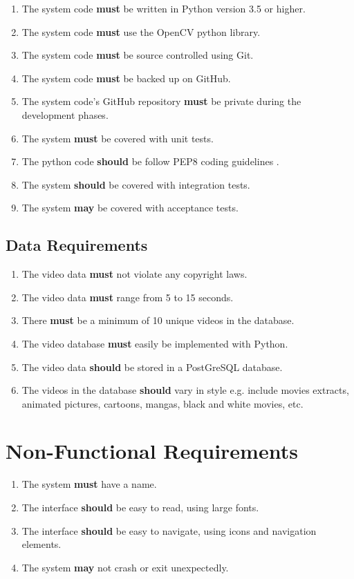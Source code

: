 \begin{enumerate}
    \item The system code \textbf{must} be written in Python version 3.5 or higher.
    \item The system code \textbf{must} use the OpenCV python library.
    \item The system code \textbf{must} be source controlled using Git.
    \item The system code \textbf{must} be backed up on GitHub.
    \item The system code's GitHub repository \textbf{must} be private during the development phases.
    \item The system \textbf{must} be covered with unit tests.
    \item The python code \textbf{should} be follow PEP8 coding guidelines \cite{pep8}.
    \item The system \textbf{should} be covered with integration tests.
    \item The system \textbf{may} be covered with acceptance tests.
\end{enumerate}

\subsection{Data Requirements}

\begin{enumerate}
    \item The video data \textbf{must} not violate any copyright laws.
    \item The video data \textbf{must} range from 5 to 15 seconds.
    \item There \textbf{must} be a minimum of 10 unique videos in the database.
    \item The video database \textbf{must} easily be implemented with Python.
    \item The video data \textbf{should} be stored in a PostGreSQL database.
    \item The videos in the database \textbf{should} vary in style e.g. include movies extracts, animated pictures, cartoons, mangas, black and white movies, etc.
    
\end{enumerate}

\section{Non-Functional Requirements}

\begin{enumerate}
    \item The system \textbf{must} have a name.
    \item The interface \textbf{should} be easy to read, using large fonts.
    \item The interface \textbf{should} be easy to navigate, using icons and navigation elements.
    \item The system \textbf{may} not crash or exit unexpectedly.
\end{enumerate}
